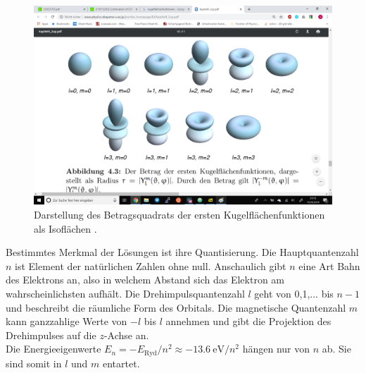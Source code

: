 \begin{figure}
  \centering
  \includegraphics[width=\textwidth]{data/kugelschei.png}
  \caption{Darstellung des Betragsquadrats der ersten Kugelflächenfunktionen als Isoflächen \cite{kugelflaechenfunktionen}.}
  \label{fig:kugelflaechenfunktionen}
\end{figure}

Bestimmtes Merkmal der Lösungen ist ihre Quantisierung. Die Hauptquantenzahl $n$ ist Element der natürlichen Zahlen ohne null. Anschaulich gibt $n$ eine Art Bahn des Elektrons an, also in welchem Abstand sich das Elektron am wahrscheinlichsten aufhält. Die Drehimpulsquantenzahl $l$ geht von 0,1,... bis $n-1$ und beschreibt die räumliche Form des Orbitals. Die magnetische Quantenzahl $m$ kann ganzzahlige Werte von $-l$ bis $l$ annehmen und gibt die Projektion des Drehimpulses auf die $z$-Achse an.\\
Die Energieeigenwerte $E_n = -E_{\text{Ryd}}/n^2 \approx -\SI{13.6}{\electronvolt}/n^2$ hängen nur von $n$ ab. Sie sind somit in $l$ und $m$ entartet.

